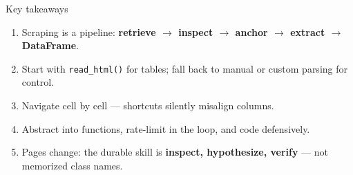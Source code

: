 \documentclass[9pt,aspectratio=169]{beamer}
\begin{document}
\begin{frame}{Key takeaways}
    \begin{enumerate}
        \item Scraping is a pipeline: \textbf{retrieve $\rightarrow$ inspect $\rightarrow$ anchor $\rightarrow$ extract $\rightarrow$ DataFrame}.
        \item Start with \texttt{read\_html()} for tables; fall back to manual or custom parsing for control.
        \item Navigate cell by cell --- shortcuts silently misalign columns.
        \item Abstract into functions, rate-limit in the loop, and code defensively.
        \item Pages change: the durable skill is \textbf{inspect, hypothesize, verify} --- not memorized class names.
    \end{enumerate}
    \vspace{1em}
\end{frame}
\end{document}
